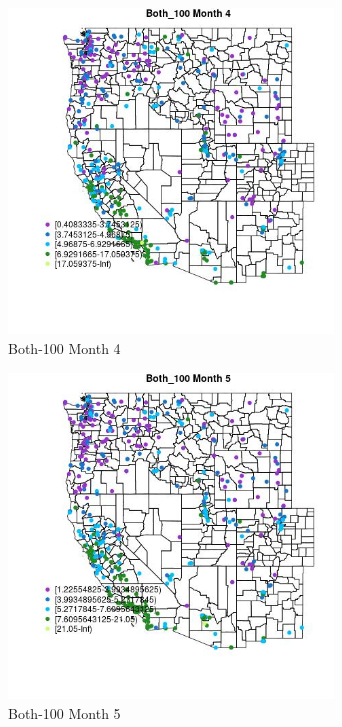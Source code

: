 \clearpage 

\begin{figure} 
\centering  
\includegraphics[width=0.77\textwidth]{Code_Outputs/ML_input_report_ML_input_PM25_Step5_part_d_de_duplicated_aves_ML_input_MapObsMo4Both_100.jpg} 
\caption{\label{fig:ML_input_report_ML_input_PM25_Step5_part_d_de_duplicated_aves_ML_inputMapObsMo4Both_100}Both-100 Month 4} 
\end{figure} 
 

\begin{figure} 
\centering  
\includegraphics[width=0.77\textwidth]{Code_Outputs/ML_input_report_ML_input_PM25_Step5_part_d_de_duplicated_aves_ML_input_MapObsMo5Both_100.jpg} 
\caption{\label{fig:ML_input_report_ML_input_PM25_Step5_part_d_de_duplicated_aves_ML_inputMapObsMo5Both_100}Both-100 Month 5} 
\end{figure} 
 

